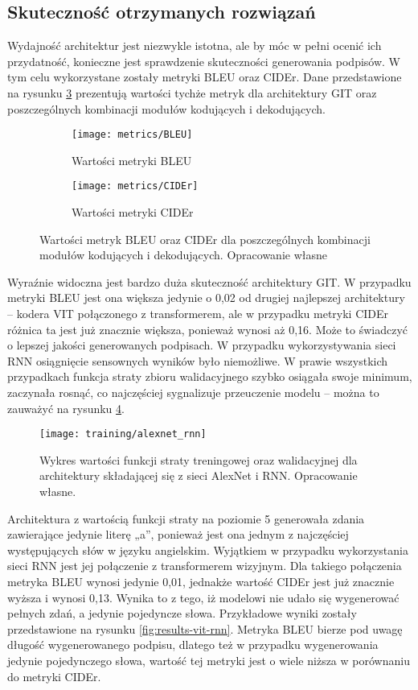 \subsection{Skuteczność otrzymanych rozwiązań}
Wydajność architektur jest niezwykle istotna, ale by móc w pełni ocenić ich przydatność, konieczne jest sprawdzenie skuteczności generowania podpisów. W tym celu wykorzystane zostały metryki BLEU oraz CIDEr. Dane przedstawione na rysunku \ref{fig:metrics} prezentują wartości tychże metryk dla architektury GIT oraz poszczególnych kombinacji modułów kodujących i dekodujących.
\begin{figure}[H]
    \centering
    \begin{subfigure}{.5\textwidth}
        \centering
        \texttt{[image: metrics/BLEU]}
        \caption{Wartości metryki BLEU}
        \label{fig:bleu}
    \end{subfigure}%
    \centering
    \begin{subfigure}{.5\textwidth}
        \centering
        \texttt{[image: metrics/CIDEr]}
        \caption{Wartości metryki CIDEr}
        \label{fig:cider}
    \end{subfigure}%
    \caption{Wartości metryk BLEU oraz CIDEr dla poszczególnych kombinacji modułów kodujących i dekodujących. Opracowanie własne}
    \label{fig:metrics}
\end{figure}
\noindent Wyraźnie widoczna jest bardzo duża skuteczność architektury GIT. W przypadku metryki BLEU jest ona większa jedynie o 0,02 od drugiej najlepszej architektury -- kodera VIT połączonego z transformerem, ale w przypadku metryki CIDEr różnica ta jest już znacznie większa, ponieważ wynosi aż 0,16. Może to świadczyć o lepszej jakości generowanych podpisach.
W przypadku wykorzystywania sieci RNN osiągnięcie sensownych wyników było niemożliwe. W prawie wszystkich przypadkach funkcja straty zbioru walidacyjnego szybko osiągała swoje minimum, zaczynała rosnąć, co najczęściej sygnalizuje przeuczenie modelu -- można to zauważyć na rysunku \ref{fig:training-alexnet-rnn}.
\begin{figure}[H]
    \centering
    \texttt{[image: training/alexnet\_rnn]}
    \caption{Wykres wartości funkcji straty treningowej oraz walidacyjnej dla architektury składającej się z sieci AlexNet i RNN. Opracowanie własne.}
    \label{fig:training-alexnet-rnn}
\end{figure}
\noindent Architektura z wartością funkcji straty na poziomie 5 generowała zdania zawierające jedynie literę „a”, ponieważ jest ona jednym z najczęściej występujących słów w języku angielskim. Wyjątkiem w przypadku wykorzystania sieci RNN jest jej połączenie z transformerem wizyjnym. Dla takiego połączenia metryka BLEU wynosi jedynie 0,01, jednakże wartość CIDEr jest już znacznie wyższa i wynosi 0,13. Wynika to z tego, iż modelowi nie udało się wygenerować pełnych zdań, a jedynie pojedyncze słowa. Przykładowe wyniki zostały przedstawione na rysunku \ref{fig:results-vit-rnn}. Metryka BLEU bierze pod uwagę długość wygenerowanego podpisu, dlatego też w przypadku wygenerowania jedynie pojedynczego słowa, wartość tej metryki jest o wiele niższa w porównaniu do metryki CIDEr.
